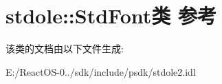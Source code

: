 \hypertarget{classstdole_1_1_std_font}{}\section{stdole\+:\+:Std\+Font类 参考}
\label{classstdole_1_1_std_font}


该类的文档由以下文件生成\+:\begin{DoxyCompactItemize}
\item 
E\+:/\+React\+O\+S-\/0../sdk/include/psdk/stdole2.\+idl\end{DoxyCompactItemize}
